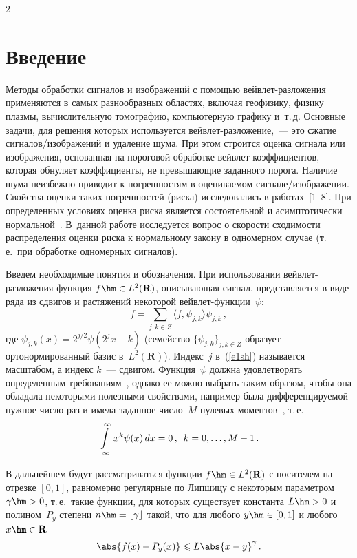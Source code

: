       \begin{multicols}{2}

            \label{st\stat}


\section{Введение}

Методы обработки сигналов и изображений с помощью вейвлет-разложения применяются в 
самых разнообразных областях, включая геофизику, физику плазмы, вычислительную 
томографию, компьютерную графику и~т.\,д. Основные задачи, для решения которых 
используется вейвлет-раз\-ло\-же\-ние,~--- это сжатие сигналов/изображений и удаление 
шума. При этом строится оценка сигнала или изображения, основанная на пороговой 
обработке вейвлет-коэффициентов, которая обнуляет коэффициенты, не превышающие 
заданного порога. Наличие шума неизбежно приводит к погрешностям в оцениваемом 
сигнале/изображении. Свойства оценки таких погрешностей (риска) исследовались 
в работах~[1--8]. При определенных условиях оценка риска является состоятельной 
и асимптотически нормальной~\cite{7sh}. В~данной работе исследуется вопрос о скорости 
сходимости распределения оценки риска к нормальному закону в одномерном случае (т.\,е.\ 
при обработке одномерных сигналов).

Введем необходимые понятия и обозначения. При использовании вейвлет-разложения функция 
$f\hm\in L^2(\mathbf{R})$, описывающая сигнал, представляется в виде ряда из 
сдвигов и растяжений некоторой вейв\-лет-функции~$\psi$:
\begin{equation}
f=\sum_{j,k\in Z}\langle f,\psi_{j,k}\rangle\psi_{j,k}\,,\label{e1sh}
\end{equation}
где $\psi_{j,k}(x)=2^{j/2}\psi(2^jx-k)$ (семейство $\{\psi_{j,k}\}_{j,k\in Z}$ 
образует ортонормированный базис в~$L^2(\mathbf{R})$). Индекс~$j$ в~(\ref{e1sh}) 
называется масштабом, а индекс $k$~--- сдвигом. Функция~$\psi$ должна удовлетворять 
определенным требованиям~\cite{9sh}, однако ее можно выбрать таким образом, чтобы 
она обладала некоторыми полезными свойствами, например была дифференцируемой нужное 
число раз и имела заданное число~$M$ нулевых моментов~\cite{9sh}, т.\,е.\
$$
\int\limits_{-\infty}^{\infty}x^k\psi(x)\,dx=0\,,\enskip k=0,\ldots,M-1\,.
$$

В дальнейшем будут рассматриваться функции $f\hm\in L^2(\mathbf{R})$ с носителем на 
отрезке $[0,1]$, равномерно регулярные по Липшицу с некоторым параметром $\gamma\hm>0$, 
т.\,е.\ такие функции, для которых существует константа $L\hm>0$ и полином~$P_y$ 
степени $n\hm=\lfloor\gamma\rfloor$ такой, что для любого $y\hm\in[0,1]$ и любого 
$x\hm\in\mathbf{R}$
$$
\abs{f(x)-P_y(x)}\leqslant L\abs{x-y}^\gamma\,.
$$


\end{multicols}
